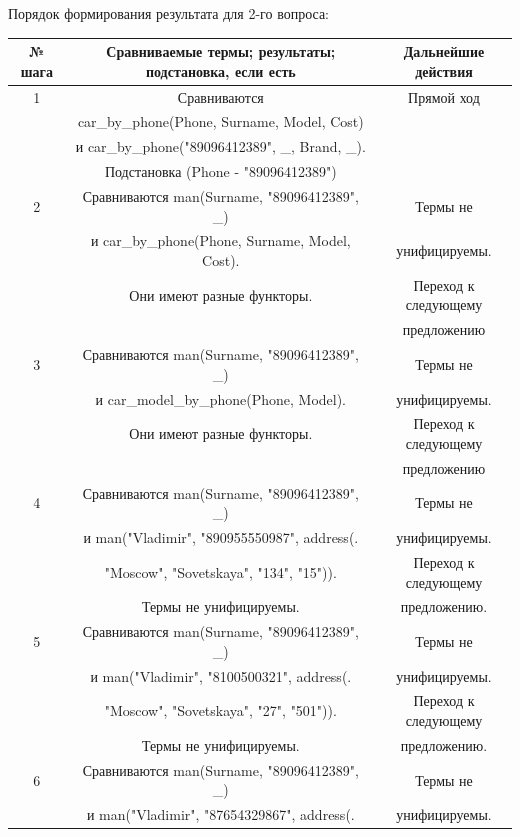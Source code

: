 \documentclass[12pt]{report}
\begin{document}
Порядок формирования результата для 2-го вопроса:
\begin{table}[H]
	\begin{center}
		\begin{tabular}{|c c c |} 
			\hline
			№ шага & Сравниваемые термы; результаты; подстановка, если есть & Дальнейшие действия \\  
			\hline
			1 & Сравниваются & Прямой ход \\
			& car\_by\_phone(Phone, Surname, Model, Cost) & \\
			& и car\_by\_phone("89096412389", \_, Brand, \_).  & \\
			& Подстановка (Phone - "89096412389"{}) &\\
			\hline
			2 & Сравниваются man(Surname, "89096412389"{}, \_) & Термы не \\
			& и car\_by\_phone(Phone, Surname, Model, Cost). & унифицируемы. \\
			& Они имеют разные функторы. &Переход к следующему \\
			& & предложению\\
			\hline
			3 & Сравниваются man(Surname, "89096412389"{}, \_) & Термы не \\
			& и car\_model\_by\_phone(Phone, Model). & унифицируемы. \\
			& Они имеют разные функторы. & Переход к следующему \\
			& & предложению\\
			\hline
			4 & Сравниваются man(Surname, "89096412389"{}, \_) & Термы не \\
			& и man("Vladimir"{}, "890955550987"{}, address(. & унифицируемы. \\
			& "Moscow"{}, "Sovetskaya"{}, "134"{}, "15"{})).  & Переход к следующему \\
			& Термы не унифицируемы. & предложению. \\
			\hline
			5 & Сравниваются man(Surname, "89096412389"{}, \_) & Термы не \\
			& и man("Vladimir"{}, "8100500321"{}, address(. & унифицируемы. \\
			& "Moscow"{}, "Sovetskaya"{}, "27"{}, "501"{})).  & Переход к следующему \\
			& Термы не унифицируемы. & предложению. \\
			\hline
			6 & Сравниваются man(Surname, "89096412389"{}, \_) & Термы не \\
			& и man("Vladimir"{}, "87654329867"{}, address(. & унифицируемы. \\

\end{tabular}
\end{center}
\end{table}
\end{document}
